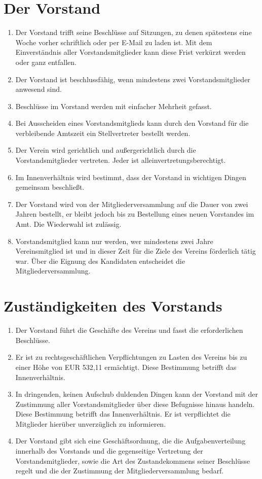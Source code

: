 \documentclass[a4paper, 12pt]{scrartcl}
\begin{document}
\section{Der Vorstand}
\begin{enumerate}
\item Der Vorstand trifft seine Beschlüsse auf Sitzungen, zu denen spätestens eine Woche vorher schriftlich oder per E-Mail zu laden ist. Mit dem Einverständnis aller Vorstandsmitglieder kann diese Frist verkürzt werden oder ganz entfallen.
	\item Der Vorstand ist beschlussfähig, wenn mindestens zwei Vorstandsmitglieder anwesend sind.
	\item Beschlüsse im Vorstand werden mit einfacher Mehrheit gefasst.
	\item Bei Ausscheiden eines Vorstandsmitglieds kann durch den Vorstand für die verbleibende Amtszeit ein Stellvertreter bestellt werden.
	\item Der Verein wird gerichtlich und außergerichtlich durch die
    Vorstandsmitglieder vertreten.  Jeder ist alleinvertretungsberechtigt.
	\item Im Innenverhältnis wird bestimmt, dass der Vorstand in wichtigen Dingen gemeinsam beschließt.
	\item Der Vorstand wird von der Mitgliederversammlung auf die Dauer von zwei Jahren bestellt, er bleibt jedoch bis zu Bestellung eines neuen Vorstandes im Amt. Die Wiederwahl ist zulässig.
	\item Vorstandsmitglied kann nur werden, wer mindestens zwei Jahre Vereinsmitglied ist und in dieser Zeit für die Ziele des Vereins förderlich
tätig war. Über die Eignung des Kandidaten entscheidet die Mitgliederversammlung.
\end{enumerate}

\section{Zuständigkeiten des Vorstands}
\begin{enumerate}
	\item Der Vorstand führt die Geschäfte des Vereins und fasst die erforderlichen Beschlüsse.
	\item Er ist zu rechtsgeschäftlichen Verpflichtungen zu Lasten des
    Vereins bis zu einer Höhe von EUR 532,11 ermächtigt. Diese Bestimmung 
    betrifft das Innenverhältnis.
	\item In dringenden, keinen Aufschub duldenden Dingen kann der Vorstand mit der Zustimmung aller Vorstandsmitglieder über diese Befugnisse hinaus handeln. Diese Bestimmung betrifft das Innenverhältnis. Er ist verpflichtet die Mitglieder hierüber unverzüglich zu informieren.
	\item Der Vorstand gibt sich eine Geschäftsordnung, die die Aufgabenverteilung innerhalb des Vorstands und die gegenseitige Vertretung der Vorstandsmitglieder, sowie die Art des Zustandekommens seiner Beschlüsse regelt und die der Zustimmung der Mitgliederversammlung bedarf.
\end{enumerate}
\end{document}
